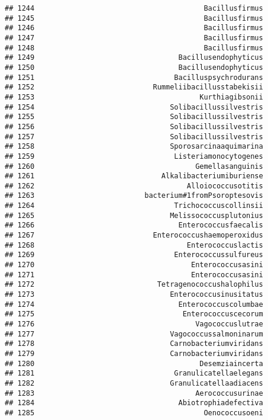 \documentclass[
]{article}
\begin{document}
\begin{verbatim}
## 1244                                        Bacillusfirmus
## 1245                                        Bacillusfirmus
## 1246                                        Bacillusfirmus
## 1247                                        Bacillusfirmus
## 1248                                        Bacillusfirmus
## 1249                                  Bacillusendophyticus
## 1250                                  Bacillusendophyticus
## 1251                                 Bacilluspsychrodurans
## 1252                            Rummeliibacillusstabekisii
## 1253                                       Kurthiagibsonii
## 1254                                Solibacillussilvestris
## 1255                                Solibacillussilvestris
## 1256                                Solibacillussilvestris
## 1257                                Solibacillussilvestris
## 1258                                Sporosarcinaaquimarina
## 1259                                 Listeriamonocytogenes
## 1260                                      Gemellasanguinis
## 1261                              Alkalibacteriumiburiense
## 1262                                    Alloiococcusotitis
## 1263                          bacterium#1fromPsoroptesovis
## 1264                                 Trichococcuscollinsii
## 1265                                Melissococcusplutonius
## 1266                                  Enterococcusfaecalis
## 1267                            Enterococcushaemoperoxidus
## 1268                                    Enterococcuslactis
## 1269                                 Enterococcussulfureus
## 1270                                     Enterococcusasini
## 1271                                     Enterococcusasini
## 1272                             Tetragenococcushalophilus
## 1273                                Enterococcusinusitatus
## 1274                                  Enterococcuscolumbae
## 1275                                   Enterococcuscecorum
## 1276                                      Vagococcuslutrae
## 1277                                Vagococcussalmoninarum
## 1278                                Carnobacteriumviridans
## 1279                                Carnobacteriumviridans
## 1280                                       Desemziaincerta
## 1281                                 Granulicatellaelegans
## 1282                                Granulicatellaadiacens
## 1283                                      Aerococcusurinae
## 1284                                  Abiotrophiadefectiva
## 1285                                        Oenococcusoeni

\end{verbatim}
\end{document}
